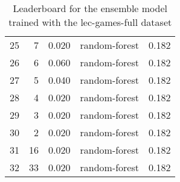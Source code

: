 \begin{table}[]
\begin{tabular}{lrrlr}
		25 & 7    & 0.020           & random-forest & 0.182 \\
		26 & 6    & 0.060           & random-forest & 0.182 \\
		27 & 5    & 0.040           & random-forest & 0.182 \\
		28 & 4    & 0.020           & random-forest & 0.182 \\
		29 & 3    & 0.020           & random-forest & 0.182 \\
		30 & 2    & 0.020           & random-forest & 0.182 \\
		31 & 16   & 0.020           & random-forest & 0.182 \\
		32 & 33   & 0.020           & random-forest & 0.182 \\
	\end{tabular}

	\caption{Leaderboard for the ensemble model trained with the lec-games-full dataset}
	\label{tab:lb-lec-games-full-randsplit}
\end{table}

